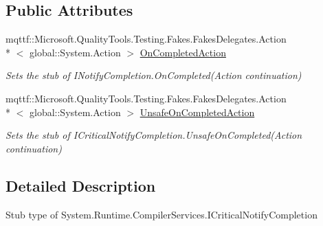 \subsection*{Public Attributes}
\begin{DoxyCompactItemize}
\item 
mqttf\-::\-Microsoft.\-Quality\-Tools.\-Testing.\-Fakes.\-Fakes\-Delegates.\-Action\\*
$<$ global\-::\-System.\-Action $>$ \hyperlink{class_system_1_1_runtime_1_1_compiler_services_1_1_fakes_1_1_stub_i_critical_notify_completion_a93ec9befe19e1959531569519e167e31}{On\-Completed\-Action}
\begin{DoxyCompactList}\small\item\em Sets the stub of I\-Notify\-Completion.\-On\-Completed(\-Action continuation)\end{DoxyCompactList}\item 
mqttf\-::\-Microsoft.\-Quality\-Tools.\-Testing.\-Fakes.\-Fakes\-Delegates.\-Action\\*
$<$ global\-::\-System.\-Action $>$ \hyperlink{class_system_1_1_runtime_1_1_compiler_services_1_1_fakes_1_1_stub_i_critical_notify_completion_a782dabaf5d9d6ba625e63f4184f95325}{Unsafe\-On\-Completed\-Action}
\begin{DoxyCompactList}\small\item\em Sets the stub of I\-Critical\-Notify\-Completion.\-Unsafe\-On\-Completed(\-Action continuation)\end{DoxyCompactList}\end{DoxyCompactItemize}


\subsection{Detailed Description}
Stub type of System.\-Runtime.\-Compiler\-Services.\-I\-Critical\-Notify\-Completion



